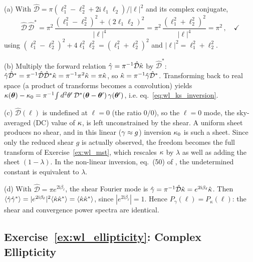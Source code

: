 (a) With $\hat{\mathcal D} =
\pi(\ell_1^2 - \ell_2^2 + 2\mathrm i\ell_1\ell_2)/|\boldsymbol\ell|^2$ and
its complex conjugate,
\begin{equation*}
    \hat{\mathcal D}\,\hat{\mathcal D}^*
    = \pi^2\,\frac{(\ell_1^2 - \ell_2^2)^2 + (2\ell_1\ell_2)^2}
    {|\boldsymbol\ell|^4}
    = \pi^2\,\frac{(\ell_1^2 + \ell_2^2)^2}{|\boldsymbol\ell|^4}
    = \pi^2\,, \quad \checkmark
\end{equation*}
using $(\ell_1^2 - \ell_2^2)^2 + 4\ell_1^2\ell_2^2 =
(\ell_1^2 + \ell_2^2)^2$ and $|\boldsymbol\ell|^2 = \ell_1^2 + \ell_2^2$.

(b) Multiply the forward relation
$\hat{\gamma} = \pi^{-1}\hat{\mathcal D}\hat{\kappa}$ by
$\hat{\mathcal D}^*$:
$\hat{\gamma}\hat{\mathcal D}^* = \pi^{-1}\hat{\mathcal D}\hat{\mathcal D}^*
\hat{\kappa} = \pi^{-1}\pi^2\hat{\kappa} = \pi\hat{\kappa}$, so
$\hat{\kappa} = \pi^{-1}\hat{\gamma}\hat{\mathcal D}^*$.  Transforming back to
real space (a product of transforms becomes a convolution) yields
$\kappa(\boldsymbol{\theta}) - \kappa_0 = \pi^{-1}\!\int d^2\theta'\,
\mathcal D^*(\boldsymbol{\theta} - \boldsymbol{\theta}')\,\gamma(\boldsymbol{\theta}')$, i.e.
eq.~\eqref{eq:wl_ks_inversion}. \checkmark

(c) $\hat{\mathcal D}(\boldsymbol\ell)$ is undefined at
$\boldsymbol\ell = 0$ (the ratio $0/0$), so the $\boldsymbol\ell = 0$ mode,
the sky-averaged (DC) value of $\kappa$, is left unconstrained by
the shear.  A uniform sheet produces no shear, and in this
linear ($\gamma \approx g$) inversion $\kappa_0$ is such a
sheet.  Since only the reduced shear $g$ is actually observed, the
freedom becomes the full transform of Exercise~\ref{ex:wl_mst}, which
rescales $\kappa$ by $\lambda$ as well as adding the sheet $(1-\lambda)$.
In the non-linear inversion, eq.~(50) of
\citet[Part~3]{schneider_kochanek_wambsganss_2006}, the undetermined
constant is equivalent to $\lambda$.

(d) With $\hat{\mathcal D} = \pi e^{2\mathrm i\beta_\ell}$, the
shear Fourier mode is
$\hat{\gamma} = \pi^{-1}\hat{\mathcal D}\hat{\kappa} =
e^{2\mathrm i\beta_\ell}\hat{\kappa}$.  Then
$\langle\hat{\gamma}\hat{\gamma}^*\rangle =
|e^{2\mathrm i\beta_\ell}|^2\langle\hat{\kappa}\hat{\kappa}^*\rangle =
\langle\hat{\kappa}\hat{\kappa}^*\rangle$, since
$|e^{2\mathrm i\beta_\ell}| = 1$.  Hence $P_\gamma(\ell) = P_\kappa(\ell)$:
the shear and convergence power spectra are identical. \checkmark

\subsection*{Exercise~\ref{ex:wl_ellipticity}: Complex Ellipticity}

